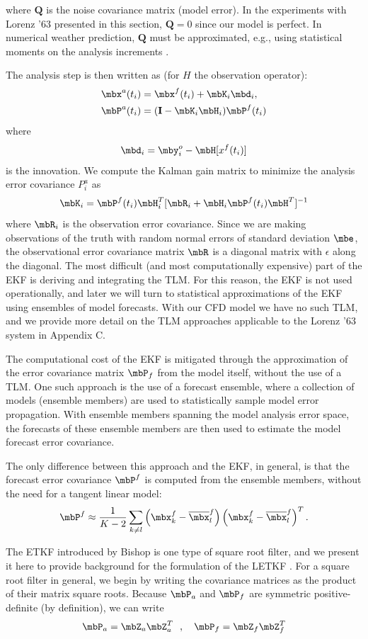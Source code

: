 where $\mathbf{Q}$ is the noise covariance matrix (model error).
In the experiments with Lorenz '63 presented in this section, $\mathbf{Q} = 0$ since our model is perfect.
In numerical weather prediction, $\mathbf{Q}$ must be approximated, e.g., using statistical moments on the analysis increments \cite{danforth2007estimating,li2009accounting,danforth2008using}.

The analysis step is then written as (for $H$ the observation operator):
\begin{align} \mbx^a (t_i ) &= \mbx^f (t_i) + \mbK_i \mbd_i,\\
\mbP^a (t_i) &= (\mathbf{I} - \mbK_i \mbH_i )\mbP^f (t_i) \end{align}
where
\[ \mbd_i = \mby_i^o - \mbH[x^f (t_i) ] \]
is the innovation. We compute the Kalman gain matrix to minimize the analysis error covariance $P^a _i$ as
\[ \mbK_i = \mbP^f (t_i) \mbH_i ^T [ \mbR_i + \mbH_i \mbP^f (t_i) \mbH^T ] ^{-1} \]
where $\mbR_i$ is the observation error covariance.
Since we are making observations of the truth with random normal errors of standard deviation $\mbe$, the observational error covariance matrix $\mbR$ is a diagonal matrix with $\epsilon$ along the diagonal.
The most difficult (and most computationally expensive) part of the EKF is deriving and integrating the TLM.
For this reason, the EKF is not used operationally, and later we will turn to statistical approximations of the EKF using ensembles of model forecasts.
With our CFD model we have no such TLM, and we provide more detail on the TLM approaches applicable to the Lorenz '63 system in Appendix C.

The computational cost of the EKF is mitigated through the approximation of the error covariance matrix $\mbP_f$ from the model itself, without the use of a TLM.
One such approach is the use of a forecast ensemble, where a collection of models (ensemble members) are used to statistically sample model error propagation.
With ensemble members spanning the model analysis error space, the forecasts of these ensemble members are then used to estimate the model forecast error covariance.

The only difference between this approach and the EKF, in general, is that the forecast error covariance $\mbP^f$ is computed from the ensemble members, without the need for a tangent linear model:
\[ \mbP^f \approx \frac{1}{K-2} \sum _{k\neq l} \left ( \mbx_k ^f - \overline{\mbx} ^f _l \right ) \left (\mbx_k ^f - \overline{\mbx} ^f _l \right ) ^T .\]

The ETKF introduced by Bishop is one type of square root filter, and we present it here to provide background for the formulation of the LETKF \cite{bishop2001adaptive}.
For a square root filter in general, we begin by writing the covariance matrices as the product of their matrix square roots.
Because $\mbP_a$ and $\mbP_f$ are symmetric positive-definite (by definition), we can write
\begin{equation} \mbP_a = \mbZ_a \mbZ_a^T ~~,~~~ \mbP_f = \mbZ_f \mbZ_f^T \end{equation}

